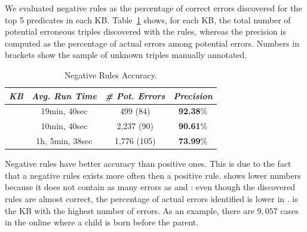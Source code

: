 We evaluated negative rules as the percentage of correct errors discovered for the top 5 predicates in each KB. Table~\ref{tab:neg_rules_acc} shows, for each KB, the total number of potential erroneous triples discovered with the rules, whereas the precision is computed as the percentage of actual errors among potential errors. Numbers in brackets show the sample of unknown triples manually annotated.

\begin{table}[b]
\vspace{-2ex}
	\centering
	\caption{Negative Rules Accuracy.}
	\label{tab:neg_rules_acc}
	\begin{small}
	\begin{tabular}{|c|c|c|c|}
		\hline
		\hline
		{\it KB}&{\it Avg. Run Time}&{\it \# Pot. Errors} & {\it Precision} \tabularnewline
		\hline
		\dbpedia & 19min, 40sec& 499 (84) & \textbf{92.38}\%\tabularnewline
		\yago & 10min, 40sec & 2,237 (90) & \textbf{90.61}\%\tabularnewline
		\wikidata & 1h, 5min, 38sec & 1,776 (105)& \textbf{73.99}\%\tabularnewline
		\hline
	\end{tabular}
	\end{small}
\end{table}


Negative rules have better accuracy than positive ones. 
This is due to the fact that a negative rules exists more often then a positive rule.
\wikidata shows lower numbers because it does not contain as many errors as \dbpedia and \yago: even though the discovered rules are almost correct, the percentage of actual errors identified is lower in \wikidata. 
 \yago is the KB with the highest number of errors. As an example, there are $9,057$ cases in the online \yago where a child is born before the parent. 

